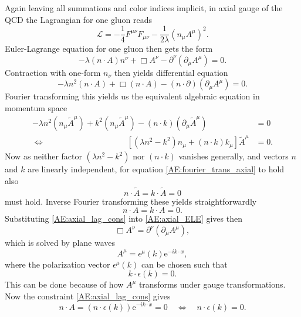 \documentclass[a4paper, twoside, english, 12pt]{article}
\begin{document}
Again leaving all summations and color indices implicit, in axial gauge of the QCD the Lagrangian for one gluon reads
\begin{equation}
	\mathcal{L} = - \frac{1}{4}F^{\mu\nu}F_{\mu\nu} - \frac{1}{2\lambda}(n_\mu A^\mu)^2.
\end{equation}
Euler-Lagrange equation for one gluon then gets the form
\begin{equation}\label{AE:axial_ELE}
	-\lambda\left(n\cdot A\right)n^\nu + \Box A^\nu -\partial^\nu\left(\partial_\mu A^\mu\right)= 0.
\end{equation}
Contraction with one-form $n_\nu$ then yields differential equation
\begin{equation}
-\lambda n^2\left(n\cdot A\right) + \Box \left(n\cdot A\right) -\left(n\cdot\partial\right)\left(\partial_\mu A^\mu\right)= 0.
\end{equation}
Fourier transforming this yields us the equivalent algebraic equation in momentum space
\begin{align}\label{AE:fourier_trans_axial}
-\lambda n^2\left(n_\mu \tilde{A}^\mu\right) + k^2 \left(n_\mu \tilde{A}^\mu\right) -\left(n\cdot k\right)\left(\partial_\mu \tilde{A}^\mu\right) &= 0 \\[1em]
\Leftrightarrow  \qquad\qquad\qquad \qquad\qquad \left[(\lambda n^2-k^2)n_\mu + (n\cdot k)k_\mu\right]\tilde{A}^\mu &= 0.
\end{align}
Now as neither factor $(\lambda n^2-k^2)$ nor $(n\cdot k)$ vanishes generally, and vectors $n$ and $k$ are linearly independent, for equation \eqref{AE:fourier_trans_axial} to hold also
\begin{equation}
	n\cdot \tilde{A} = 	k\cdot \tilde{A} = 0
\end{equation}
must hold. Inverse Fourier transforming these yields straightforwardly
\begin{equation}\label{AE:axial_lag_cons}
n\cdot A = 	k\cdot A = 0.
\end{equation}
Substituting \eqref{AE:axial_lag_cons} into \eqref{AE:axial_ELE} gives then
\begin{equation}
	\Box A^\nu= \partial^\nu\left(\partial_\mu A^\mu\right),
\end{equation}
which is solved by plane waves
\begin{equation}
	A^\mu = \epsilon^\mu(k)\text{e}^{-ik\cdot x},
\end{equation}
where the polarization vector $\epsilon^\mu(k)$ can be chosen such that 
\begin{equation}\label{AE:axial_pol_k}
	k\cdot \epsilon(k) = 0. 
\end{equation}
This can be done because of how $A^\mu$ transforms under gauge transformations. Now the constraint \eqref{AE:axial_lag_cons} gives
\begin{equation}\label{AE:axial_pol_n}
	n\cdot A = \left(n\cdot \epsilon(k)\right)\text{e}^{-ik\cdot x} = 0 \quad \Leftrightarrow \quad n\cdot \epsilon(k) = 0.
\end{equation}
\end{document}
